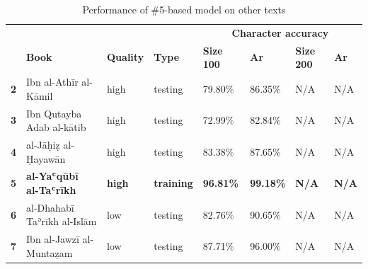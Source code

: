 \begin{subappendices}
\begin{table}[H]
\begin{minipage}{\textwidth}
\begin{center}
\caption{Performance of \#5-based model on other texts}
\label{tab:soa_atab4}
\renewcommand*{\thefootnote}{\alph{footnote}}
\begin{tabularx}{\textwidth}{lp{2.2cm}XXXXXX} \toprule
& & & & \multicolumn{4}{c}{\textbf{Character accuracy}}\\
\cline{5-8}
& \textbf{Book}& \textbf{Quality} & \textbf{Type} & \textbf{Size 100} & \textbf{Ar}& \textbf{Size 200} & \textbf{Ar}\\ \midrule
\textbf{2} & Ibn al-Athīr \newline\scriptsize{al-Kāmil} &  	  high& testing & 79.80\% & 86.35\% & N/A & N/A\\
\textbf{3} & Ibn Qutayba \newline\scriptsize{Adab al-kātib} & high& testing	& 72.99\% & 82.84\% & N/A & N/A \\
\textbf{4} & al-Jāḥiẓ \newline\scriptsize{al-Ḥayawān} & 	  high& testing & 83.38\% & 87.65\% & N/A & N/A\\
\textbf{5} & \textbf{al-Yaʿqūbī \newline\scriptsize{al-Taʿrīkh}} & 	  \textbf{high} & \textbf{training} & \textbf{96.81\%} & \textbf{99.18\%} & \textbf{N/A} & \textbf{N/A}\\
\textbf{6} & al-Dhahabī \newline\scriptsize{Taʾrīkh al-Islām}  & low& testing	& 82.76\% & 90.65\% & N/A & N/A\\
\textbf{7} & Ibn al-Jawzī \newline\scriptsize{al-Muntaẓam} &    low& testing & 87.71\% & 96.00\% & N/A & N/A\\
\bottomrule
\end{tabularx}
\end{center}
\end{minipage}
\end{table}
\end{subappendices}
